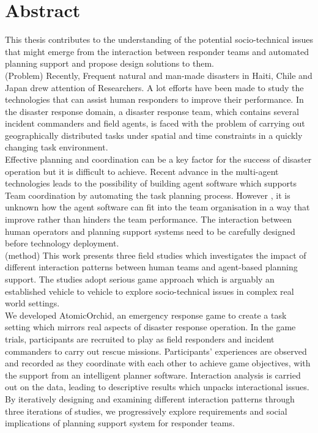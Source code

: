 \begingroup
\let\clearpage\relax
\let\cleardoublepage\relax
\let\cleardoublepage\relax

\chapter*{Abstract}
This thesis contributes to the understanding of the potential socio-technical issues that might emerge from the interaction between responder teams and automated planning support and propose design solutions to them. \\

(Problem) Recently, Frequent natural and man-made disasters in Haiti, Chile and Japan drew attention of Researchers. A lot efforts have been made to study the technologies that can assist human responders to improve their performance. In the disaster response domain,  a disaster response team, which contains several incident commanders and field agents, is faced with the problem of carrying out geographically distributed tasks under spatial and time constraints in a quickly changing task environment. \\ 

Effective planning and coordination can be a key factor for the success of disaster operation but it is difficult to achieve. Recent advance in the multi-agent technologies leads to the possibility of building agent software which supports Team coordination by automating the task planning process. However , it is unknown how the agent software can fit into the team organisation in a way that improve rather than hinders the team performance. The interaction between human operators and planning support systems need to be carefully designed before technology deployment.\\

(method) This work presents three field studies which investigates the impact of different interaction patterns between human teams and agent-based planning support. The studies adopt serious game approach which is arguably an established vehicle to vehicle to explore socio-technical issues in complex real world settings.\\

We developed AtomicOrchid, an emergency response game to create a task setting which mirrors real aspects of disaster response operation. In the game trials, participants are recruited to play as field responders and incident commanders to carry out rescue missions. Participants' experiences are observed and recorded as they coordinate with each other to achieve game objectives, with the support from an intelligent planner software. Interaction analysis is carried out on the data, leading to descriptive results which unpacks interactional issues. By iteratively designing and examining different interaction patterns through three iterations of studies, we progressively explore requirements and social implications of planning support system for responder teams.\\

